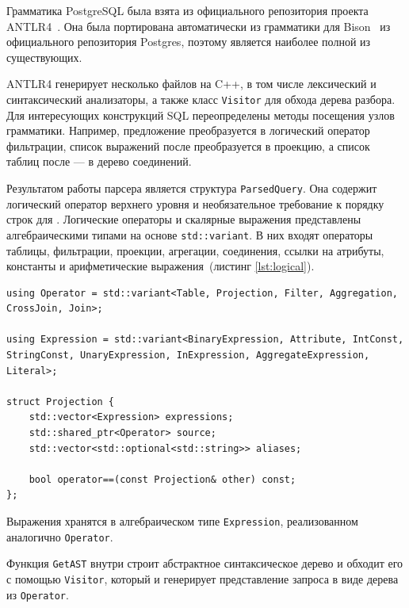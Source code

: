 \documentclass[14pt, russian]{scrartcl}
\newcommand{\refAlgo}[1]{(листинг \ref{#1})}
\begin{document}
Грамматика PostgreSQL была взята из официального репозитория проекта
ANTLR4~\cite{Antlr4PostgreSQL}. Она была портирована автоматически из грамматики
для Bison~\cite{PostgresBisonGrammar} из официального репозитория Postgres,
поэтому является наиболее полной из существующих.

ANTLR4 генерирует несколько файлов на C++, в том числе лексический и
синтаксический анализаторы, а также класс \verb|Visitor| для обхода дерева
разбора. Для интересующих конструкций SQL переопределены методы посещения узлов
грамматики. Например, предложение \WHERE{} преобразуется в логический оператор
фильтрации, список выражений после \SELECT{} преобразуется в проекцию, а список
таблиц после \FROM{} --- в дерево соединений.

Результатом работы парсера является структура \texttt{ParsedQuery}. Она содержит
логический оператор верхнего уровня и необязательное требование к порядку строк
для \ORDERBY{}. Логические операторы и скалярные выражения представлены
алгебраическими типами на основе \texttt{std::variant}. В них входят операторы
таблицы, фильтрации, проекции, агрегации, соединения, ссылки на атрибуты,
константы и арифметические выражения~\refAlgo{lst:logical}.

\begin{listing}[H]
  \caption{Объявление типов для операторов реляционной алгебры и выражений.}
  \label{lst:logical}
  \begin{verbatim}
using Operator = std::variant<Table, Projection, Filter, Aggregation, CrossJoin, Join>;

using Expression = std::variant<BinaryExpression, Attribute, IntConst, StringConst, UnaryExpression, InExpression, AggregateExpression, Literal>;

struct Projection {
    std::vector<Expression> expressions;
    std::shared_ptr<Operator> source;
    std::vector<std::optional<std::string>> aliases;

    bool operator==(const Projection& other) const;
};
  \end{verbatim}
\end{listing}

Выражения хранятся в алгебраическом типе \verb|Expression|, реализованном
аналогично \verb|Operator|.

Функция \verb|GetAST| внутри строит абстрактное синтаксическое дерево и обходит
его с помощью \verb|Visitor|, который и генерирует представление запроса в виде
дерева из \verb|Operator|.
\end{document}

